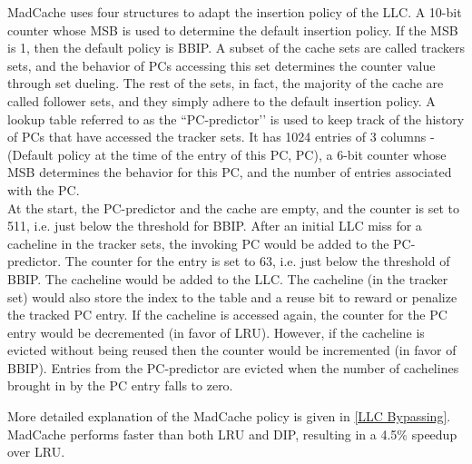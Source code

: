 \documentclass[11pt, swedish, openany]{book}
\begin{document}
MadCache uses four structures to adapt the insertion policy of the LLC.
A 10-bit counter whose MSB is used to determine the default insertion policy. If the MSB is 1, then the default policy is BBIP.
A subset of the cache sets are called trackers sets, and the behavior of PCs accessing this set determines the counter value through set dueling.
The rest of the sets, in fact, the majority of the cache are called follower sets, and they simply adhere to the default insertion policy.
A lookup table referred to as the ``PC-predictor’’ is used to keep track of the history of PCs that have accessed the tracker sets. It has 1024 entries of 3 columns - (Default policy at the time of the entry of this PC, PC), a 6-bit counter whose MSB determines the behavior for this PC, and the number of entries associated with the PC. \\

At the start, the PC-predictor and the cache are empty, and the counter is set to 511, i.e. just below the threshold for BBIP.
After an initial LLC miss for a cacheline in the tracker sets, the invoking PC would be added to the PC-predictor. The counter for the entry is set to 63, i.e. just below the threshold of BBIP. The cacheline would be added to the LLC. The cacheline (in the tracker set) would also store the index to the table and a reuse bit to reward or penalize the tracked PC entry.
If the cacheline is accessed again, the counter for the PC entry would be decremented (in favor of LRU). However, if the cacheline is evicted without being reused then the counter would be incremented (in favor of BBIP).
Entries from the PC-predictor are evicted when the number of cachelines brought in by the PC entry falls to zero.

More detailed explanation of the MadCache policy is given in \autoref{LLC Bypassing}. \\

MadCache performs faster than both LRU and DIP, resulting in a 4.5\% speedup over LRU.
\end{document}
